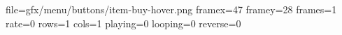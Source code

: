 file=gfx/menu/buttons/item-buy-hover.png
framex=47
framey=28
frames=1
rate=0
rows=1
cols=1
playing=0
looping=0
reverse=0